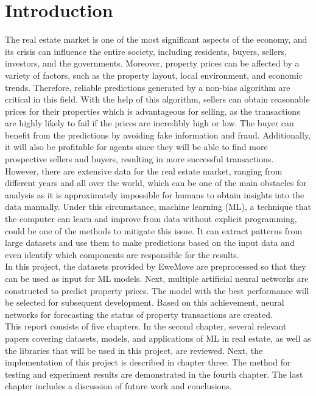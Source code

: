 \documentclass[12pt,twoside]{report}
\begin{document}
\chapter{Introduction}

The real estate market is one of the most significant aspects of the economy, and its crisis can influence the entire society, including residents, buyers, sellers, investors, and the governments. Moreover, property prices can be affected by a variety of factors, such as the property layout, local environment, and economic trends. Therefore, reliable predictions generated by a non-bias algorithm are critical in this field. With the help of this algorithm, sellers can obtain reasonable prices for their properties which is advantageous for selling, as the transactions are highly likely to fail if the prices are incredibly high or low. The buyer can benefit from the predictions by avoiding fake information and fraud. Additionally, it will also be profitable for agents since they will be able to find more prospective sellers and buyers, resulting in more successful transactions. 
\\

However, there are extensive data for the real estate market, ranging from different years and all over the world, which can be one of the main obstacles for analysis as it is approximately impossible for humans to obtain insights into the data manually. Under this circumstance, machine learning (ML), a technique that the computer can learn and improve from data without explicit programming, could be one of the methods to mitigate this issue. It can extract patterns from large datasets and use them to make predictions based on the input data and even identify which components are responsible for the results.
\\

In this project, the datasets provided by EweMove are preprocessed so that they can be used as input for ML models. Next, multiple artificial neural networks are constructed to predict property prices. The model with the best performance will be selected for subsequent development. Based on this achievement, neural networks for forecasting the status of property transactions are created.
\\

This report consists of five chapters. In the second chapter, several relevant papers covering datasets, models, and applications of ML in real estate, as well as the libraries that will be used in this project, are reviewed. Next, the implementation of this project is described in chapter three. The method for testing and experiment results are demonstrated in the fourth chapter. The last chapter includes a discussion of future work and conclusions. 
\end{document}

